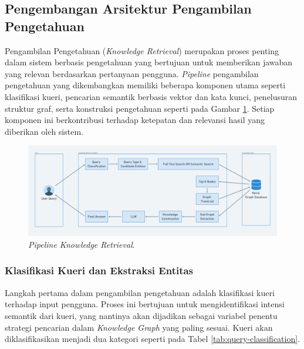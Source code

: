\subsection{Pengembangan Arsitektur Pengambilan Pengetahuan}
Pengambilan Pengetahuan (\textit{Knowledge Retrieval}) merupakan proses penting dalam sistem berbasis pengetahuan yang bertujuan untuk memberikan jawaban yang relevan berdasarkan pertanyaan pengguna.
\textit{Pipeline} pengambilan pengetahuan yang dikembangkan memiliki beberapa komponen utama seperti klasifikasi kueri, pencarian semantik berbasis vektor dan kata kunci, penelusuran struktur graf, serta konstruksi pengetahuan seperti pada Gambar \ref{fig:knowledge-retrieval-pipeline}.
Setiap komponen ini berkontribusi terhadap ketepatan dan relevansi hasil yang diberikan oleh sistem.

\begin{figure}[h]
	\includegraphics[width=1\textwidth]{images/knowledge-retrieval-pipeline.png}
	\caption{\textit{Pipeline Knowledge Retrieval}.}
	\label{fig:knowledge-retrieval-pipeline}
\end{figure}

\subsubsection{Klasifikasi Kueri dan Ekstraksi Entitas}
Langkah pertama dalam pengambilan pengetahuan adalah klasifikasi kueri terhadap input pengguna.
Proses ini bertujuan untuk mengidentifikasi intensi semantik dari kueri, yang nantinya akan dijadikan sebagai variabel penentu strategi pencarian dalam \textit{Knowledge Graph} yang paling sesuai.
Kueri akan diklasifikasikan menjadi dua kategori seperti pada Tabel \ref{tab:query-classification}.

